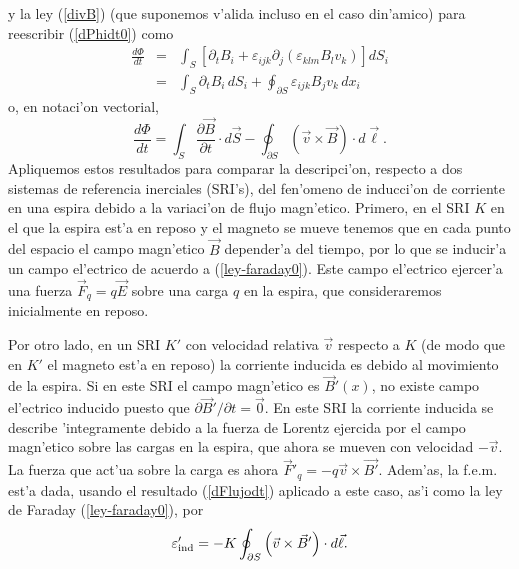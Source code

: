y la ley (\ref{divB}) (que suponemos v'alida incluso en el caso din'amico) para reescribir (\ref{dPhidt0}) como
\begin{eqnarray}
 \frac{d\Phi}{dt}&=&\int_S\left[\partial_tB_i+\varepsilon_{ijk}
\partial_j(\varepsilon_{klm} B_lv_k)\right] dS_i \\
&=& \int_S\partial_tB_i\, dS_i +\oint_{\partial S}\varepsilon_{ijk}
B_jv_k\,dx_i 
\end{eqnarray}
o, en notaci'on vectorial, 
\begin{equation}\label{dFlujodt}
  \frac{d\Phi}{dt}=\int_S\frac{\partial\vec{B}}{\partial
t}\cdot d\vec{S}-\oint_{\partial
S}\left(\vec{v}\times\vec{B}\right)\cdot d\vec{\ell}.
\end{equation}
Apliquemos estos resultados para comparar la descripci'on, respecto a dos sistemas de referencia inerciales (SRI's), del fen'omeno de inducci'on de corriente en una espira debido a la variaci'on de flujo magn'etico. Primero, en el SRI $K$ en el que la espira est'a en reposo y el magneto se mueve tenemos que en cada punto del espacio el campo magn'etico $\vec{B}$ depender'a del tiempo, por lo que se inducir'a un campo el'ectrico de acuerdo a (\ref{ley-faraday0}). Este campo el'ectrico ejercer'a una fuerza $\vec{F}_q=q\vec{E}$ sobre una carga $q$ en la espira, que consideraremos inicialmente en reposo. 

Por otro lado, en un SRI $K'$ con velocidad relativa $\vec{v}$ respecto a $K$ (de modo que en $K'$ el magneto est'a en reposo) la corriente inducida es debido al movimiento de la espira. Si en este SRI el campo magn'etico es $\vec{B}'(x)$, no existe campo el'ectrico inducido puesto que $\partial\vec{B}'/\partial t=\vec{0}$. En este SRI la corriente inducida se describe 'integramente debido a la fuerza de Lorentz ejercida por el campo magn'etico sobre las cargas en la espira, que ahora se mueven con velocidad $-\vec{v}$. La fuerza que act'ua sobre la carga es ahora $\vec{F}'_q=-q\vec{v}\times\vec{B'}$. Adem'as, la f.e.m. est'a dada, usando el resultado (\ref{dFlujodt}) aplicado a este caso, as'i como la ley de Faraday (\ref{ley-faraday0}), por 
\begin{equation}
\varepsilon'_{\rm ind}=-K\oint_{\partial S}\left(\vec{v}\times\vec{B}'\right)\cdot d\vec{\ell}.
\end{equation}

